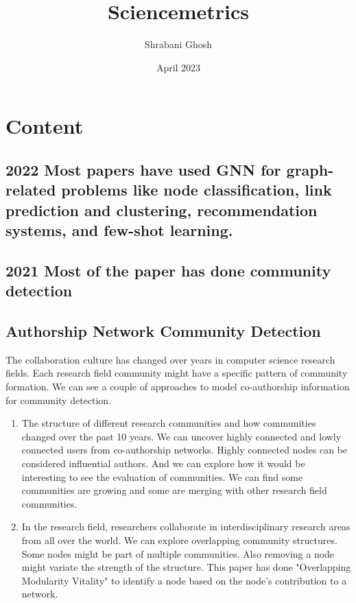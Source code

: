 \documentclass{article}
\title{Sciencemetrics}
\author{Shrabani Ghosh}
\date{April 2023}
\begin{document}
\maketitle

\section{Content}

\subsection{ 2022  Most papers have used GNN for graph-related problems like node classification, link prediction and clustering, recommendation systems, and few-shot learning.}
\subsection{2021 Most of the paper has done community detection}
\subsection{Authorship Network Community Detection}

The collaboration culture has changed over years in computer science research fields. Each research field community might have a specific pattern of community formation. We can see a couple of approaches to model co-authorship information for community detection. 
\begin{enumerate}
    \item The structure of different research communities and how communities changed over the past 10 years. We can uncover highly connected and lowly connected users from co-authorship networks. Highly connected nodes can be considered influential authors. And we can explore how it would be interesting to see the evaluation of communities. We can find some communities are growing and some are merging with other research field communities. \cite{mandaglio2019dynamic}  
    \item In the research field, researchers collaborate in interdisciplinary research areas from all over the world. We can explore overlapping community structures. Some nodes might be part of multiple communities. Also removing a node might variate the strength of the structure. This paper \cite{rajeh2021identifying}has done "Overlapping Modularity Vitality" to identify a node based on the node's contribution to a network. 
\end{enumerate}
\end{document}
